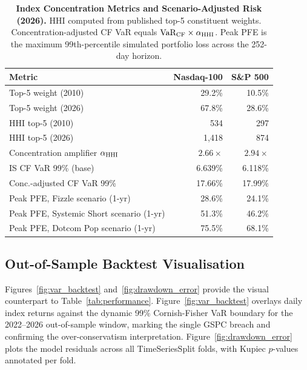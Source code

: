 \begin{table}[tp]
  \centering
  \caption{
    \textbf{Index Concentration Metrics and Scenario-Adjusted Risk (2026).}
    HHI computed from published top-5 constituent weights. Concentration-adjusted
    CF VaR equals $\text{VaR}_{\text{CF}} \times \alpha_{\text{HHI}}$. Peak PFE is the maximum
    99th-percentile simulated portfolio loss across the 252-day horizon.
  }
  \label{tab:concentration}
  \begin{tabular}{lrr}
    \toprule
    \textbf{Metric} & \textbf{Nasdaq-100} & \textbf{S\&P 500} \\
    \midrule
    Top-5 weight (2010)               & 29.2\%      & 10.5\%       \\
    Top-5 weight (2026)               & 67.8\%      & 28.6\%       \\
    HHI top-5 (2010)                  & 534         & 297          \\
    HHI top-5 (2026)                  & 1{,}418      & 874          \\
    Concentration amplifier $\alpha_{\text{HHI}}$ & $2.66\times$ & $2.94\times$ \\
    \midrule
    IS CF VaR 99\% (base)             & 6.639\%     & 6.118\%      \\
    Conc.-adjusted CF VaR 99\%        & 17.66\%     & 17.99\%      \\
    \midrule
    Peak PFE, Fizzle scenario (1-yr)         & 28.6\%      & 24.1\%   \\
    Peak PFE, Systemic Short scenario (1-yr) & 51.3\%      & 46.2\%   \\
    Peak PFE, Dotcom Pop scenario (1-yr)     & 75.5\%      & 68.1\%   \\
    \bottomrule
  \end{tabular}
\end{table}

\subsection{Out-of-Sample Backtest Visualisation}

Figures~\ref{fig:var_backtest} and~\ref{fig:drawdown_error} provide the visual
counterpart to Table~\ref{tab:performance}. Figure~\ref{fig:var_backtest} overlays
daily index returns against the dynamic 99\% Cornish-Fisher VaR boundary for the
2022--2026 out-of-sample window, marking the single GSPC breach and confirming the
over-conservatism interpretation. Figure~\ref{fig:drawdown_error} plots the model
residuals across all TimeSeriesSplit folds, with Kupiec $p$-values annotated per fold.

